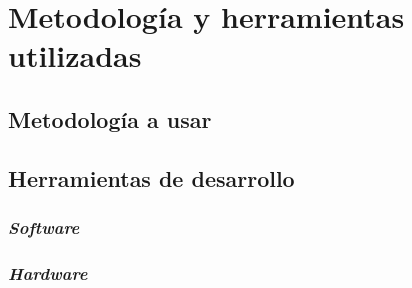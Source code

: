 \section{Metodología y herramientas utilizadas}
\label{sec:metodologia-herramientas}


\subsection{Metodología a usar}
\label{subsec:metodologia}

\subsection{Herramientas de desarrollo}
\label{subsec:herramientas}


\subsubsection*{\textit{Software}}

\subsubsection*{\textit{Hardware}}
